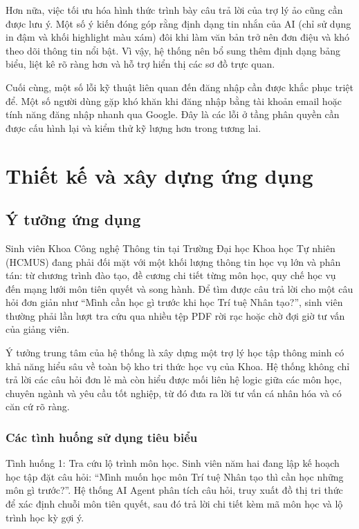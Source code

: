 Hơn nữa, việc tối ưu hóa hình thức trình bày câu trả lời của trợ lý ảo cũng cần được lưu ý. Một số ý kiến đóng góp rằng định dạng tin nhắn của AI (chỉ sử dụng in đậm và khối highlight màu xám) đôi khi làm văn bản trở nên đơn điệu và khó theo dõi thông tin nổi bật. Vì vậy, hệ thống nên bổ sung thêm định dạng bảng biểu, liệt kê rõ ràng hơn và hỗ trợ hiển thị các sơ đồ trực quan.

Cuối cùng, một số lỗi kỹ thuật liên quan đến đăng nhập cần được khắc phục triệt để. Một số người dùng gặp khó khăn khi đăng nhập bằng tài khoản email hoặc tính năng đăng nhập nhanh qua Google. Đây là các lỗi ở tầng phân quyền cần được cấu hình lại và kiểm thử kỹ lượng hơn trong tương lai.
 

\section{Thiết kế và xây dựng ứng dụng}
\label{Chapter4-ThietKe}

\subsection{Ý tưởng ứng dụng}

Sinh viên Khoa Công nghệ Thông tin tại Trường Đại học Khoa học Tự nhiên (HCMUS) đang phải đối mặt với một khối lượng thông tin học vụ lớn và phân tán: từ chương trình đào tạo, đề cương chi tiết từng môn học, quy chế học vụ đến mạng lưới môn tiên quyết và song hành. Để tìm được câu trả lời cho một câu hỏi đơn giản như ``Mình cần học gì trước khi học Trí tuệ Nhân tạo?'', sinh viên thường phải lần lượt tra cứu qua nhiều tệp PDF rời rạc hoặc chờ đợi giờ tư vấn của giảng viên.

Ý tưởng trung tâm của hệ thống là xây dựng một trợ lý học tập thông minh có khả năng hiểu sâu về toàn bộ kho tri thức học vụ của Khoa. Hệ thống không chỉ trả lời các câu hỏi đơn lẻ mà còn hiểu được mối liên hệ logic giữa các môn học, chuyên ngành và yêu cầu tốt nghiệp, từ đó đưa ra lời tư vấn cá nhân hóa và có căn cứ rõ ràng.

\subsubsection{Các tình huống sử dụng tiêu biểu}

Tình huống 1: Tra cứu lộ trình môn học.
Sinh viên năm hai đang lập kế hoạch học tập đặt câu hỏi: ``Mình muốn học môn Trí tuệ Nhân tạo thì cần học những môn gì trước?''. Hệ thống AI Agent phân tích câu hỏi, truy xuất đồ thị tri thức để xác định chuỗi môn tiên quyết, sau đó trả lời chi tiết kèm mã môn học và lộ trình học kỳ gợi ý.


